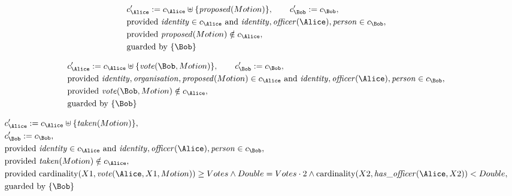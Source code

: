 \begin{align*}
&
c'_
{
\Alice
}
 := 
c_
{
\Alice
}
 \uplus 
\{
\mathit{\detokenize{
proposed
}}
(
Motion
)
\}
, \qquad 
c'_
{
\Bob
}
 := 
c_
{
\Bob
}
,\\
&
\text{provided } 
\mathit{\detokenize{
identity
}}
 \in c_
{
\Alice
}
 \text{ and } 
\mathit{\detokenize{
identity
}}
,
\mathit{\detokenize{
officer
}}
(
\Alice
)
,
\mathit{\detokenize{
person
}}
 \in c_
{
\Bob
}
,\\
&
\text{provided } 
\mathit{\detokenize{
proposed
}}
(
Motion
)
 \notin c_
{
\Alice
}
,\\
&
\text{guarded by } \{
\Bob
\}
\end{align*}

\begin{align*}
&
c'_
{
\Alice
}
 := 
c_
{
\Alice
}
 \uplus 
\{
\mathit{\detokenize{
vote
}}
(
\Bob
,
Motion
)
\}
, \qquad 
c'_
{
\Bob
}
 := 
c_
{
\Bob
}
,\\
&
\text{provided } 
\mathit{\detokenize{
identity
}}
,
\mathit{\detokenize{
organisation
}}
,
\mathit{\detokenize{
proposed
}}
(
Motion
)
 \in c_
{
\Alice
}
 \text{ and } 
\mathit{\detokenize{
identity
}}
,
\mathit{\detokenize{
officer
}}
(
\Alice
)
,
\mathit{\detokenize{
person
}}
 \in c_
{
\Bob
}
,\\
&
\text{provided } 
\mathit{\detokenize{
vote
}}
(
\Bob
,
Motion
)
 \notin c_
{
\Alice
}
,\\
&
\text{guarded by } \{
\Bob
\}
\end{align*}

\begin{align*}
&
c'_
{
\Alice
}
 := 
c_
{
\Alice
}
 \uplus 
\{
\mathit{\detokenize{
taken
}}
(
Motion
)
\}
,\\
&
c'_
{
\Bob
}
 := 
c_
{
\Bob
}
,\\
&
\text{provided } 
\mathit{\detokenize{
identity
}}
 \in c_
{
\Alice
}
 \text{ and } 
\mathit{\detokenize{
identity
}}
,
\mathit{\detokenize{
officer
}}
(
\Alice
)
,
\mathit{\detokenize{
person
}}
 \in c_
{
\Bob
}
,\\
&
\text{provided } 
\mathit{\detokenize{
taken
}}
(
Motion
)
 \notin c_
{
\Alice
}
,\\
&
\text{provided } 
\mathrm{cardinality}(
X1
,
\mathit{\detokenize{
vote
}}
(
\Alice
,
X1
,
Motion
)
)
\ge
Votes
\land
Double
=
Votes
\cdot
2
\land
\mathrm{cardinality}(
X2
,
\mathit{\detokenize{
has_officer
}}
(
\Alice
,
X2
)
)
<
Double
,\\
&
\text{guarded by } \{
\Bob
\}
\end{align*}

